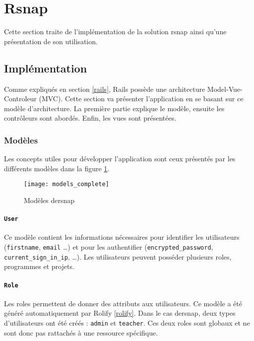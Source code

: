 \section{Rsnap}
\graphicspath{{content/7-solution/3-rsnap/images/}}
Cette section traite de l'implémentation de la solution \gls{rsnap} ainsi qu'une présentation de son utilisation.

\subsection{Implémentation}
Comme expliqués en section \ref{rails}, Rails possède une architecture Model-Vue-Controleur (MVC). Cette section va présenter l'application en se basant sur ce modèle d'architecture. La première partie explique le modèle, ensuite les contrôleurs sont abordés. Enfin, les vues sont présentées.

\subsubsection{Modèles}
Les concepts utiles pour développer l'application sont ceux présentés par les différents modèles dans la figure \ref{fig:models}.

\begin{figure}
 \begin{center}
   \texttt{[image: models\_complete]}
   \caption{Modèles de\gls{rsnap}}
   \label{fig:models}
 \end{center}
\end{figure}

\paragraph{\texttt{User}} Ce modèle contient les informations nécessaires pour identifier les utilisateurs (\texttt{firstname}, \texttt{email} \ldots) et pour les authentifier (\texttt{encrypted\_password}, \texttt{current\_sign\_in\_ip}, \ldots). Les utilisateurs peuvent posséder plusieurs \glspl{role}, programmes et projets.

\paragraph{\texttt{Role}} Les \glspl{role} permettent de donner des attributs aux utilisateurs. Ce modèle a été généré automatiquement par Rolify \ref{rolify}. Dans le cas de\gls{rsnap}, deux types d'utilisateurs ont été créés : \texttt{admin} et \texttt{teacher}. Ces deux \glspl{role} sont globaux et ne sont donc pas rattachés à une ressource spécifique.

